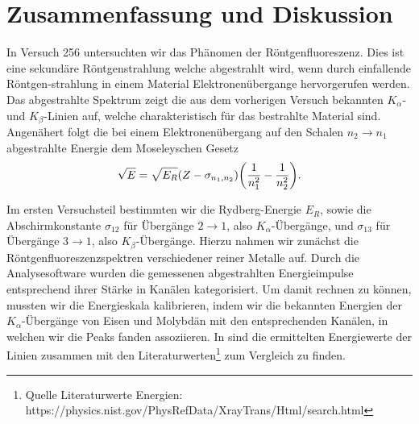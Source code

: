 \section{Zusammenfassung und Diskussion}

In Versuch 256 untersuchten wir das Phänomen der Röntgenfluoreszenz. Dies ist eine sekundäre Röntgenstrahlung welche abgestrahlt wird, wenn durch einfallende Röntgen-strahlung in einem Material Elektronenübergange hervorgerufen werden. Das abgestrahlte Spektrum zeigt die aus dem vorherigen Versuch bekannten $K_{\alpha}$- und $K_{\beta}$-Linien auf, welche charakteristisch für das bestrahlte Material sind. Angenähert folgt die bei einem Elektronenübergang auf den Schalen $n_2 \to n_1$ abgestrahlte Energie dem Moseleyschen Gesetz
\begin{align}
  \sqrt{E} = \sqrt{E_R} (Z - \sigma_{n_1,n_2}) \qty(\frac{1}{n_1^2} - \frac{1}{n_2^2}).
\end{align}

Im ersten Versuchsteil bestimmten wir die Rydberg-Energie $E_R$, sowie die Abschirmkonstante $\sigma_{12}$ für Übergänge $2 \to 1$, also $K_{\alpha}$-Übergänge, und  $\sigma_{13}$ für Übergänge $3 \to 1$, also $K_{\beta}$-Übergänge. Hierzu nahmen wir zunächst die Röntgenfluoreszenzspektren verschiedener reiner Metalle auf. Durch die Analysesoftware wurden die gemessenen abgestrahlten Energieimpulse entsprechend ihrer Stärke in Kanälen kategorisiert. Um damit rechnen zu können, mussten wir die Energieskala kalibrieren, indem wir die bekannten Energien der $K_{\alpha}$-Übergänge von Eisen und Molybdän mit den entsprechenden Kanälen, in welchen wir die Peaks fanden assoziieren. In  sind die ermittelten Energiewerte der Linien zusammen mit den Literaturwerten\footnote{Quelle Literaturwerte Energien: https://physics.nist.gov/PhysRefData/XrayTrans/Html/search.html} zum Vergleich zu finden.


